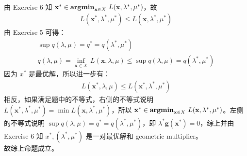 \documentclass[11pt,letter,notitlepage]{article}
\DeclareMathOperator*{\argmin}{\bf argmin}
\begin{document}
\begin{solution}
	\heiti
	\ \\
	由 Exercise 6 知 $\mathbf{x}^*\in\argmin_{\mathbf{x}\in X}\,L(\mathbf{x},\lambda^*,\mu^*)$，故
	\begin{align*}
		L(\mathbf{x}^*,\lambda^*,\mu^*) \leqslant L(\mathbf{x},\lambda^*,\mu^*)
	\end{align*}
	由 Exercise 5 可得：
	\begin{align*}
		\sup q(\lambda,\mu) = q^* = q(\lambda^*,\mu^*)\\
		q(\lambda,\mu) = \inf_{\mathbf{x}\in X}\, L(\mathbf{x},\lambda,\mu) \leqslant \sup q(\lambda,\mu) = q(\lambda^*,\mu^*)
	\end{align*}
	因为 $x^*$ 是最优解，所以进一步有：
	\begin{align*}
		L(\mathbf{x}^*,\lambda,\mu) \leqslant L(\mathbf{x}^*,\lambda^*,\mu^*)
	\end{align*}
	相反，如果满足题中的不等式，右侧的不等式说明 $L(\mathbf{x}^*,\lambda^*,\mu^*) = \min{L(\mathbf{x},\lambda^*,\mu^*)}$，所以 $\mathbf{x}^* \in \argmin_{\mathbf{x}\in X}\,L(\mathbf{x}, \lambda^*,\mu^*)$。左侧的不等式说明 $\sup q(\lambda,\mu) = q^* = q(\lambda^*,\mu^*)$，即 $\lambda^*\mathbf{g}(\mathbf{x}^*) = 0$，综上并由 Exercise 6 知 $x^*, (\lambda^*, \mu^*)$ 是一对最优解和 geometric multiplier。\\
	故综上命题成立。
\end{solution}
\end{document}
